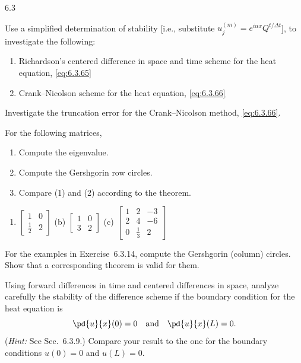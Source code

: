 \begin{exercises}{6.3}
\item Use a simplified determination of stability [i.e., substitute $u_j^{(m)} = e^{i\alpha x}Q^{t/\Delta t}$], to investigate the following:
\begin{enumerate}
\item[(a)] Richardson's centered difference in space and time scheme for the heat equation, \eqref{eq:6.3.65}
\item[(b)] Crank--Nicolson scheme for the heat equation, \eqref{eq:6.3.66}
\end{enumerate}

\item Investigate the truncation error for the Crank--Nicolson method, \eqref{eq:6.3.66}.

\item For the following matrices,
\begin{enumerate}
\item[1.] Compute the eigenvalue.
\item[2.] Compute the Gershgorin row circles.
\item[3.] Compare (1) and (2) according to the theorem.
\end{enumerate}
\begin{enumerate}
\item[(a)] $\begin{bmatrix} 1 & 0 \\ \frac{1}{2} & 2\end{bmatrix}$ \qquad
(b) $\begin{bmatrix} 1 & 0 \\ 3 & 2\end{bmatrix}$ \qquad
\starred (c) $\begin{bmatrix} 1 & 2 & -3 \\ 2 & 4 & -6 \\ 0 & \frac{1}{3} & 2\end{bmatrix}$
\end{enumerate}

\item For the examples in Exercise~6.3.14, compute the Gershgorin (column) circles.  Show that a corresponding theorem is valid for them.

\item Using forward differences in time and centered differences in space, analyze carefully the stability of the difference scheme if the boundary condition for the heat equation is
\[
\pd{u}{x}(0) = 0 \quad\text{and}\quad \pd{u}{x}(L) = 0.
\]
(\emph{Hint:} See Sec.~6.3.9.)  Compare your result to the one for the boundary conditions $u(0) = 0$ and $u(L) = 0$.


\end{exercises}
